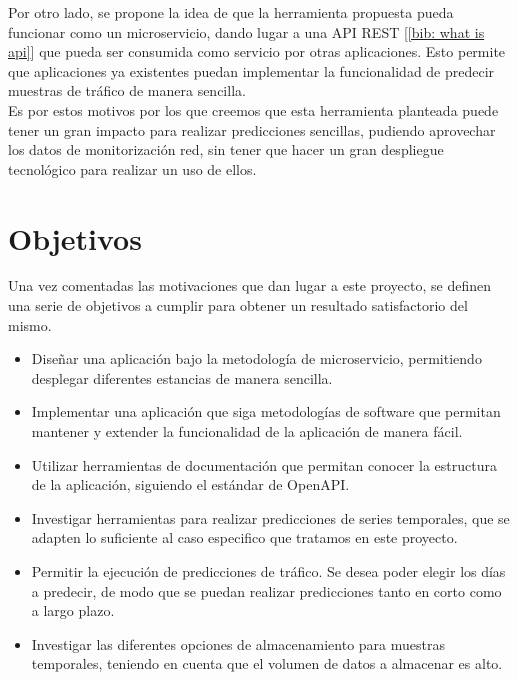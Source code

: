 \documentclass[a4paper, oneside, 12pt]{book}
\begin{document}
	\pagebreak
	
	\noindent Por otro lado, se propone la idea de que la herramienta propuesta pueda funcionar como un microservicio, dando lugar a una API REST [\ref{bib: what is api}] que pueda ser consumida como servicio por otras aplicaciones. Esto permite que aplicaciones ya existentes puedan implementar la funcionalidad de predecir muestras de tráfico de manera sencilla. \\
	
	\noindent Es por estos motivos por los que creemos que esta herramienta planteada puede tener un gran impacto para realizar predicciones sencillas, pudiendo aprovechar los datos de monitorización red, sin tener que hacer un gran despliegue tecnológico para realizar un uso de ellos. \\
	
	
	\section{Objetivos}
	
	\noindent Una vez comentadas las motivaciones que dan lugar a este proyecto, se definen una serie de objetivos a cumplir para obtener un resultado satisfactorio del mismo.
	
	\begin{itemize}
		\item Diseñar una aplicación bajo la metodología de microservicio, permitiendo desplegar diferentes estancias de manera sencilla.
		
		\item Implementar una aplicación que siga metodologías de software que permitan mantener y extender la funcionalidad de la aplicación de manera fácil.
		
		\item Utilizar herramientas de documentación que permitan conocer la estructura de la aplicación, siguiendo el estándar de OpenAPI.
		
		\item Investigar herramientas para realizar predicciones de series temporales, que se adapten lo suficiente al caso especifico que tratamos en este proyecto.
		
		\item Permitir la ejecución de predicciones de tráfico. Se desea poder elegir los días a predecir, de modo que se puedan realizar predicciones tanto en corto como a largo plazo.
		
		\item Investigar las diferentes opciones de almacenamiento para muestras temporales, teniendo en cuenta que el volumen de datos a almacenar es alto. 
	\end{itemize}
	
\end{document}
